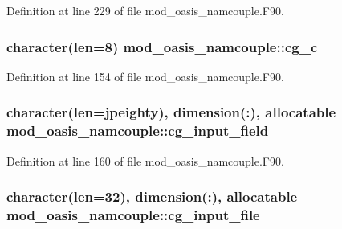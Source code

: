 Definition at line 229 of file mod\+\_\+oasis\+\_\+namcouple.\+F90.

\hypertarget{classmod__oasis__namcouple_a8a7387f27c409ea27aa53b616805f0fa}{
\subsubsection[{cg\+\_\+c}]{\setlength{\rightskip}{0pt plus 5cm}character(len=8) mod\+\_\+oasis\+\_\+namcouple\+::cg\+\_\+c\hspace{0.3cm}{\ttfamily [private]}}}\label{classmod__oasis__namcouple_a8a7387f27c409ea27aa53b616805f0fa}


Definition at line 154 of file mod\+\_\+oasis\+\_\+namcouple.\+F90.

\hypertarget{classmod__oasis__namcouple_aad4d4857b4c424e1b0f0bcc0a01aa6e3}{
\subsubsection[{cg\+\_\+input\+\_\+field}]{\setlength{\rightskip}{0pt plus 5cm}character(len={\bf jpeighty}), dimension(\+:), allocatable mod\+\_\+oasis\+\_\+namcouple\+::cg\+\_\+input\+\_\+field\hspace{0.3cm}{\ttfamily [private]}}}\label{classmod__oasis__namcouple_aad4d4857b4c424e1b0f0bcc0a01aa6e3}


Definition at line 160 of file mod\+\_\+oasis\+\_\+namcouple.\+F90.

\hypertarget{classmod__oasis__namcouple_a24f56cf88d79190f229d3fd1d62d17de}{
\subsubsection[{cg\+\_\+input\+\_\+file}]{\setlength{\rightskip}{0pt plus 5cm}character(len=32), dimension(\+:), allocatable mod\+\_\+oasis\+\_\+namcouple\+::cg\+\_\+input\+\_\+file\hspace{0.3cm}{\ttfamily [private]}}}\label{classmod__oasis__namcouple_a24f56cf88d79190f229d3fd1d62d17de}


